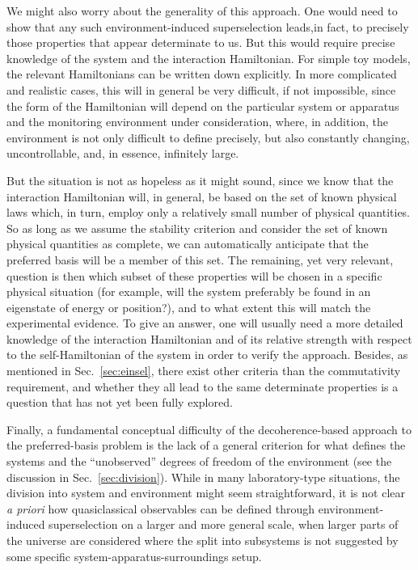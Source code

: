 \documentclass[twocolumn,rmp,aps,amsmath,amsfonts,noshowkeys,noshowpacs]{revtex4}
\begin{document}
We might also worry about the generality of this approach. One would
need to show that any such environment-induced superselection leads,in
fact, to precisely those properties that appear determinate to us. But
this would require precise knowledge of the system and the interaction
Hamiltonian.  For simple toy models, the relevant Hamiltonians can be
written down explicitly. In more complicated and realistic cases, this
will in general be very difficult, if not impossible, since the form
of the Hamiltonian will depend on the particular system or apparatus
and the monitoring environment under consideration, where, in
addition, the environment is not only difficult to define precisely,
but also constantly changing, uncontrollable, and, in essence,
infinitely large.

But the situation is not as hopeless as it might sound, since we know
that the interaction Hamiltonian will, in general, be based on the set
of known physical laws which, in turn, employ only a relatively small
number of physical quantities. So as long as we assume the stability
criterion and consider the set of known physical quantities as
complete, we can automatically anticipate that the preferred basis
will be a member of this set. The remaining, yet very relevant,
question is then which subset of these properties will be chosen in a
specific physical situation (for example, will the system preferably
be found in an eigenstate of energy or position?), and to what extent
this will match the experimental evidence. To give an answer, one will
usually need a more detailed knowledge of the interaction Hamiltonian
and of its relative strength with respect to the self-Hamiltonian of
the system in order to verify the approach.  Besides, as mentioned in
Sec.~\ref{sec:einsel}, there exist other criteria than the
commutativity requirement, and whether they all lead to the same
determinate properties is a question that has not yet been fully
explored.

Finally, a fundamental conceptual difficulty of the decoherence-based
approach to the preferred-basis problem is the lack of a general
criterion for what defines the systems and the ``unobserved'' degrees
of freedom of the environment (see the discussion in
Sec.~\ref{sec:division}). While in many laboratory-type situations,
the division into system and environment might seem straightforward,
it is not clear {\em a priori} how quasiclassical observables can be
defined through environment-induced superselection on a larger and
more general scale, when larger parts of the universe are considered
where the split into subsystems is not suggested by some specific
system-apparatus-surroundings setup.
\end{document}

